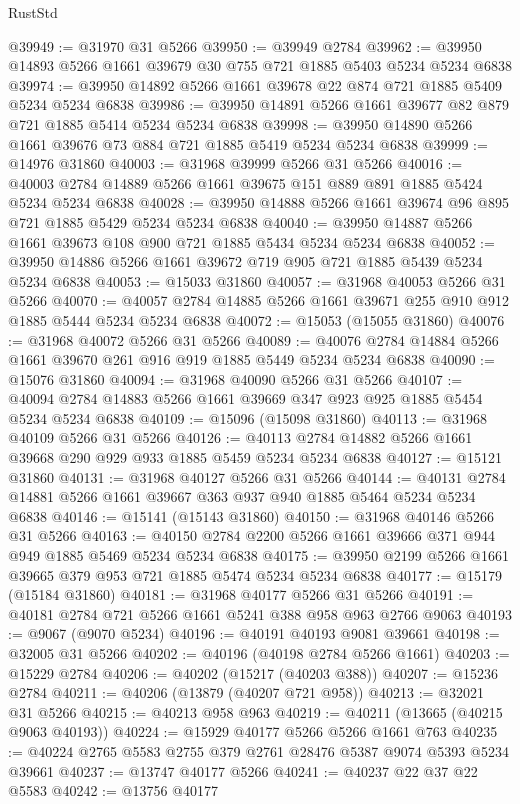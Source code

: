 \begin{lexlean}{RustStd}
\begin{coremodule}
@39949 := @31970 @31 @5266
@39950 := @39949 @2784
@39962 := @39950 @14893 @5266 @1661 @39679 @30 @755 @721 @1885 @5403 @5234 @5234 @6838
@39974 := @39950 @14892 @5266 @1661 @39678 @22 @874 @721 @1885 @5409 @5234 @5234 @6838
@39986 := @39950 @14891 @5266 @1661 @39677 @82 @879 @721 @1885 @5414 @5234 @5234 @6838
@39998 := @39950 @14890 @5266 @1661 @39676 @73 @884 @721 @1885 @5419 @5234 @5234 @6838
@39999 := @14976 @31860
@40003 := @31968 @39999 @5266 @31 @5266
@40016 := @40003 @2784 @14889 @5266 @1661 @39675 @151 @889 @891 @1885 @5424 @5234 @5234 @6838
@40028 := @39950 @14888 @5266 @1661 @39674 @96 @895 @721 @1885 @5429 @5234 @5234 @6838
@40040 := @39950 @14887 @5266 @1661 @39673 @108 @900 @721 @1885 @5434 @5234 @5234 @6838
@40052 := @39950 @14886 @5266 @1661 @39672 @719 @905 @721 @1885 @5439 @5234 @5234 @6838
@40053 := @15033 @31860
@40057 := @31968 @40053 @5266 @31 @5266
@40070 := @40057 @2784 @14885 @5266 @1661 @39671 @255 @910 @912 @1885 @5444 @5234 @5234 @6838
@40072 := @15053 (@15055 @31860)
@40076 := @31968 @40072 @5266 @31 @5266
@40089 := @40076 @2784 @14884 @5266 @1661 @39670 @261 @916 @919 @1885 @5449 @5234 @5234 @6838
@40090 := @15076 @31860
@40094 := @31968 @40090 @5266 @31 @5266
@40107 := @40094 @2784 @14883 @5266 @1661 @39669 @347 @923 @925 @1885 @5454 @5234 @5234 @6838
@40109 := @15096 (@15098 @31860)
@40113 := @31968 @40109 @5266 @31 @5266
@40126 := @40113 @2784 @14882 @5266 @1661 @39668 @290 @929 @933 @1885 @5459 @5234 @5234 @6838
@40127 := @15121 @31860
@40131 := @31968 @40127 @5266 @31 @5266
@40144 := @40131 @2784 @14881 @5266 @1661 @39667 @363 @937 @940 @1885 @5464 @5234 @5234 @6838
@40146 := @15141 (@15143 @31860)
@40150 := @31968 @40146 @5266 @31 @5266
@40163 := @40150 @2784 @2200 @5266 @1661 @39666 @371 @944 @949 @1885 @5469 @5234 @5234 @6838
@40175 := @39950 @2199 @5266 @1661 @39665 @379 @953 @721 @1885 @5474 @5234 @5234 @6838
@40177 := @15179 (@15184 @31860)
@40181 := @31968 @40177 @5266 @31 @5266
@40191 := @40181 @2784 @721 @5266 @1661 @5241 @388 @958 @963 @2766 @9063
@40193 := @9067 (@9070 @5234)
@40196 := @40191 @40193 @9081 @39661
@40198 := @32005 @31 @5266
@40202 := @40196 (@40198 @2784 @5266 @1661)
@40203 := @15229 @2784
@40206 := @40202 (@15217 (@40203 @388))
@40207 := @15236 @2784
@40211 := @40206 (@13879 (@40207 @721 @958))
@40213 := @32021 @31 @5266
@40215 := @40213 @958 @963
@40219 := @40211 (@13665 (@40215 @9063 @40193))
@40224 := @15929 @40177 @5266 @5266 @1661 @763
@40235 := @40224 @2765 @5583 @2755 @379 @2761 @28476 @5387 @9074 @5393 @5234 @39661
@40237 := @13747 @40177 @5266
@40241 := @40237 @22 @37 @22 @5583
@40242 := @13756 @40177

\end{coremodule}
\end{lexlean}

